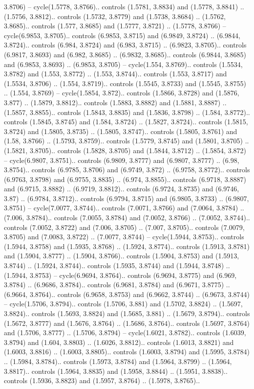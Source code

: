 3.8706) -- cycle(1.5778, 3.8766).. controls (1.5781, 3.8834) and (1.5778, 3.8841) .. (1.5756, 3.8812).. controls (1.5732, 3.8779) and (1.5738, 3.8684) .. (1.5762, 3.8685).. controls (1.577, 3.8685) and (1.5777, 3.8721) .. (1.5778, 3.8766) -- cycle(6.9853, 3.8705).. controls (6.9853, 3.8715) and (6.9849, 3.8724) .. (6.9844, 3.8724).. controls (6.984, 3.8724) and (6.983, 3.8715) .. (6.9823, 3.8705).. controls (6.9817, 3.8693) and (6.982, 3.8685) .. (6.9832, 3.8685).. controls (6.9844, 3.8685) and (6.9853, 3.8693) .. (6.9853, 3.8705) -- cycle(1.554, 3.8769).. controls (1.5534, 3.8782) and (1.553, 3.8772) .. (1.553, 3.8744).. controls (1.553, 3.8717) and (1.5534, 3.8706) .. (1.554, 3.8719).. controls (1.5545, 3.8733) and (1.5545, 3.8755) .. (1.554, 3.8769) -- cycle(1.5854, 3.872).. controls (1.5866, 3.8728) and (1.5876, 3.877) .. (1.5879, 3.8812).. controls (1.5883, 3.8882) and (1.5881, 3.8887) .. (1.5857, 3.8855).. controls (1.5843, 3.8835) and (1.5836, 3.8798) .. (1.584, 3.8772).. controls (1.5845, 3.8745) and (1.584, 3.8724) .. (1.5827, 3.8724).. controls (1.5815, 3.8724) and (1.5805, 3.8735) .. (1.5805, 3.8747).. controls (1.5805, 3.8761) and (1.58, 3.8766) .. (1.5793, 3.8759).. controls (1.5779, 3.8745) and (1.5801, 3.8705) .. (1.5821, 3.8705).. controls (1.5828, 3.8705) and (1.5844, 3.8712) .. (1.5854, 3.872) -- cycle(6.9807, 3.8751).. controls (6.9809, 3.8777) and (6.9807, 3.8777) .. (6.98, 3.8754).. controls (6.9785, 3.8706) and (6.9749, 3.872) .. (6.9758, 3.8772).. controls (6.9763, 3.8798) and (6.9755, 3.8835) .. (6.974, 3.8855).. controls (6.9718, 3.8887) and (6.9715, 3.8882) .. (6.9719, 3.8812).. controls (6.9724, 3.8735) and (6.9746, 3.87) .. (6.9784, 3.8712).. controls (6.9794, 3.8715) and (6.9805, 3.8733) .. (6.9807, 3.8751) -- cycle(7.0077, 3.8744).. controls (7.0071, 3.8766) and (7.0064, 3.8784) .. (7.006, 3.8784).. controls (7.0055, 3.8784) and (7.0052, 3.8766) .. (7.0052, 3.8744).. controls (7.0052, 3.8722) and (7.006, 3.8705) .. (7.007, 3.8705).. controls (7.0079, 3.8705) and (7.0083, 3.8722) .. (7.0077, 3.8744) -- cycle(1.5944, 3.8753).. controls (1.5944, 3.8758) and (1.5935, 3.8768) .. (1.5924, 3.8774).. controls (1.5913, 3.8781) and (1.5904, 3.8777) .. (1.5904, 3.8766).. controls (1.5904, 3.8753) and (1.5913, 3.8744) .. (1.5924, 3.8744).. controls (1.5935, 3.8744) and (1.5944, 3.8748) .. (1.5944, 3.8753) -- cycle(6.9694, 3.8764).. controls (6.9694, 3.8775) and (6.969, 3.8784) .. (6.9686, 3.8784).. controls (6.9681, 3.8784) and (6.9671, 3.8775) .. (6.9664, 3.8764).. controls (6.9658, 3.8753) and (6.9662, 3.8744) .. (6.9673, 3.8744) -- cycle(1.5706, 3.8794).. controls (1.5706, 3.881) and (1.5702, 3.8824) .. (1.5697, 3.8824).. controls (1.5693, 3.8824) and (1.5685, 3.881) .. (1.5679, 3.8794).. controls (1.5672, 3.8777) and (1.5676, 3.8764) .. (1.5686, 3.8764).. controls (1.5697, 3.8764) and (1.5706, 3.8777) .. (1.5706, 3.8794) -- cycle(1.6021, 3.8782).. controls (1.6039, 3.8794) and (1.604, 3.8803) .. (1.6026, 3.8812).. controls (1.6013, 3.8821) and (1.6003, 3.8816) .. (1.6003, 3.8805).. controls (1.6003, 3.8794) and (1.5995, 3.8784) .. (1.5984, 3.8784).. controls (1.5973, 3.8784) and (1.5964, 3.8799) .. (1.5964, 3.8817).. controls (1.5964, 3.8835) and (1.5958, 3.8844) .. (1.5951, 3.8838).. controls (1.5936, 3.8823) and (1.5957, 3.8764) .. (1.5978, 3.8765).. 